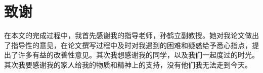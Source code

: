 % 
\section{致谢}
在本文的完成过程中，我首先感谢我的指导老师，孙鹤立副教授。她对我论文做出了指导性的意见，在论文撰写过程中及时对我遇到的困难和疑惑给予悉心指点，提出了许多有益的改善性意见。其次我想感谢我的同学，以及我们一起度过的时光。其次我要感谢我的家人给我的物质和精神上的支持，没有他们我无法走到今天。
% 